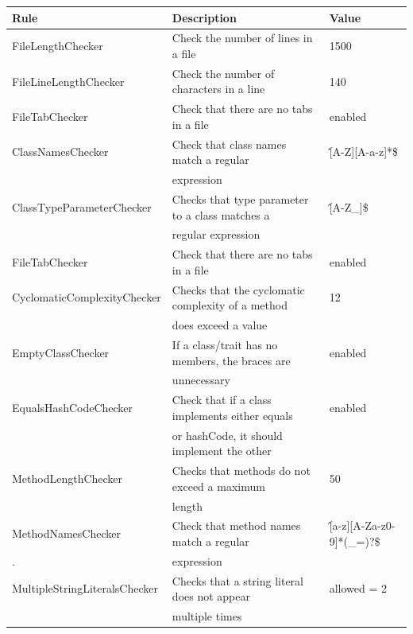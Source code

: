 \documentclass{report}
\begin{document}
\renewcommand{\arraystretch}{1.2}
\begin{center}
\begin{longtable}{|l|l|l|}
\hline
\textbf{\textcolor{mygray}{Rule}} & \textbf{\textcolor{mygray}{Description}} & \textbf{\textcolor{mygray}{Value}}  \\
\hline
FileLengthChecker & \small{Check the number of lines in a file} & 1500  \\
\hline
FileLineLengthChecker & \small{Check the number of characters in a line} & 140 \\
\hline
FileTabChecker & \small{Check that there are no tabs in a file} & enabled \\
\hline
ClassNamesChecker & \small{Check that class names match a regular}  & \^ [A-Z][A-a-z]*\$ \\
& \small{expression} & \\
\hline
\small{ClassTypeParameterChecker} & \small{Checks that type parameter to a class matches a} & \^[A-Z\_]\$ \\
& regular expression & \\
\hline
FileTabChecker & \small{Check that there are no tabs in a file} & enabled \\
\hline
\small{CyclomaticComplexityChecker} & \small{Checks that the cyclomatic complexity of a method} & 12 \\
&  \small{does exceed a value} & \\
\hline
EmptyClassChecker & \small{If a class/trait has no members, the braces are} & enabled \\
&  \small{unnecessary} & \\
\hline
\small{EqualsHashCodeChecker} & \small{Check that if a class implements either equals} & enabled \\ 
 & \small{or hashCode, it should implement the other} & \\
\hline
MethodLengthChecker & \small{Checks that methods do not exceed a maximum} & 50 \\
& \small{length} & \\
\hline
MethodNamesChecker & \small{Check that method names match a regular} & \^[a-z][A-Za-z0-9]*(\_=)?\$ \\
\tiny{.} & \small{expression} & \\
\hline
\small{MultipleStringLiteralsChecker} & \small{Checks that a string literal does not appear} & allowed = 2 \\
& \small{multiple times} & \\
\hline

\end{longtable}
\end{center}
\end{document}
